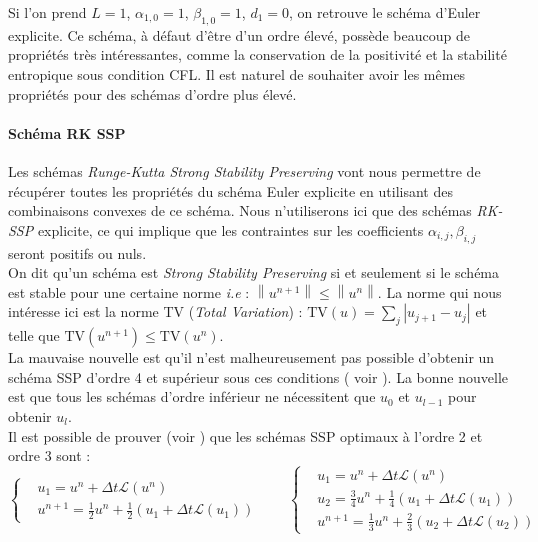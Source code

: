 Si l'on prend $L=1$, $\alpha_{1,0}=1$, $\beta_{1,0}=1$, $d_1=0$, on retrouve le schéma d’Euler explicite. 
Ce schéma, à défaut d’être d'un ordre élevé, possède beaucoup de propriétés très intéressantes, 
comme la conservation de la positivité et la stabilité entropique sous condition CFL. 
Il est naturel de souhaiter avoir les mêmes propriétés pour des schémas d’ordre plus élevé.

\paragraph{Schéma RK SSP \\}
Les schémas \textit{ Runge-Kutta Strong Stability Preserving} vont nous permettre de récupérer toutes les propriétés du schéma Euler explicite en utilisant des combinaisons convexes de ce schéma. 
Nous n'utiliserons ici que des schémas \textit{RK-SSP} explicite, ce qui implique que les contraintes sur les coefficients  $\alpha_{i,j},\beta_{i,j}$ seront positifs ou nuls. \\
On dit qu'un schéma est \textit{Strong Stability Preserving} si et seulement si le schéma est stable pour une certaine norme \textit{i.e} : $\left\|u^{n+1}\right\| \leq \left\|u^n\right\|$. 
La norme qui nous intéresse ici est la norme TV (\textit{Total Variation}) : $\text{TV}(u) = \sum_j |u_{j+1} -u_j|$ et telle que $\text{TV}(u^{n+1}) \leq \text{TV}(u^n)$. \\
La mauvaise nouvelle est qu'il n'est malheureusement pas possible d'obtenir un schéma SSP d'ordre 4  et supérieur sous ces conditions ( voir \cite{gottlieb1998total}). 
La bonne nouvelle est que tous les schémas d'ordre inférieur ne nécessitent que $u_0$ et $u_{l-1}$ pour obtenir $u_l$. \\
Il est possible de prouver (voir \cite{gottlieb1998total}) que les schémas SSP optimaux à l'ordre 2 et ordre 3 sont : 
\begin{equation}
    \left\{
    \begin{aligned}
        &u_1 = u^n + \Delta t \mathcal{L}(u^n) \\
        &u^{n+1} = \frac{1}{2}u^n + \frac{1}{2}(u_1 + \Delta t \mathcal{L}(u_1))
    \end{aligned}
    \right.
    \qquad
    \left\{
    \begin{aligned}
        &u_1 = u^n + \Delta t \mathcal{L}(u^n) \\
        &u_2 = \frac{3}{4}u^n + \frac{1}{4}(u_1 + \Delta t \mathcal{L}(u_1)) \\
        &u^{n+1} = \frac{1}{3}u^n + \frac{2}{3}(u_2 + \Delta t \mathcal{L}(u_2))
    \end{aligned}
    \right.
\end{equation}
